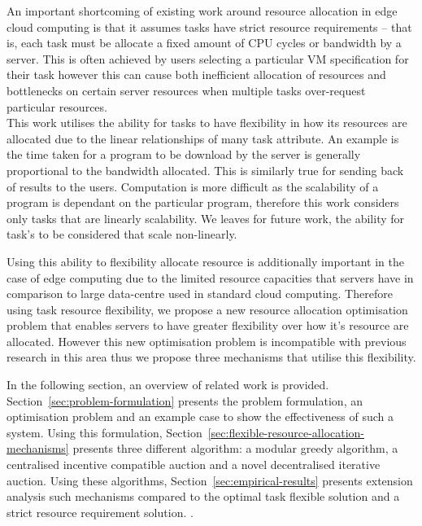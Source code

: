 An important shortcoming of existing work around resource allocation in edge cloud computing is that it assumes tasks
have strict resource requirements -- that is, each task must be allocate a fixed amount of CPU cycles or bandwidth by a
server. This is often achieved by users selecting a particular VM specification for their task however this can cause
both inefficient allocation of resources and bottlenecks on certain server resources when multiple tasks over-request
particular resources. \\
This work utilises the ability for tasks to have flexibility in how its resources are allocated due to the linear
relationships of many task attribute. An example is the time taken for a program to be download by the server is
generally proportional to the bandwidth allocated. This is similarly true for sending back of results to the users.
Computation is more difficult as the scalability of a program is dependant on the particular program, therefore this
work considers only tasks that are linearly scalability. We leaves for future work, the ability for task's to be
considered that scale non-linearly.

Using this ability to flexibility allocate resource is additionally important in the case of edge computing due to the
limited resource capacities that servers have in comparison to large data-centre used in standard cloud computing.
Therefore using task resource flexibility, we propose a new resource allocation optimisation problem that enables
servers to have greater flexibility over how it's resource are allocated. However this new optimisation problem is
incompatible with previous research in this area thus we propose three mechanisms that utilise this flexibility.

In the following section, an overview of related work is provided. Section~\ref{sec:problem-formulation} presents the
problem formulation, an optimisation problem and an example case to show the effectiveness of such a system. Using this
formulation, Section~\ref{sec:flexible-resource-allocation-mechanisms} presents three different algorithm: a modular
greedy algorithm, a centralised incentive compatible auction and a novel decentralised iterative auction. Using these
algorithms, Section~\ref{sec:empirical-results} presents extension analysis such mechanisms compared to the optimal
task flexible solution and a strict resource requirement solution. .

